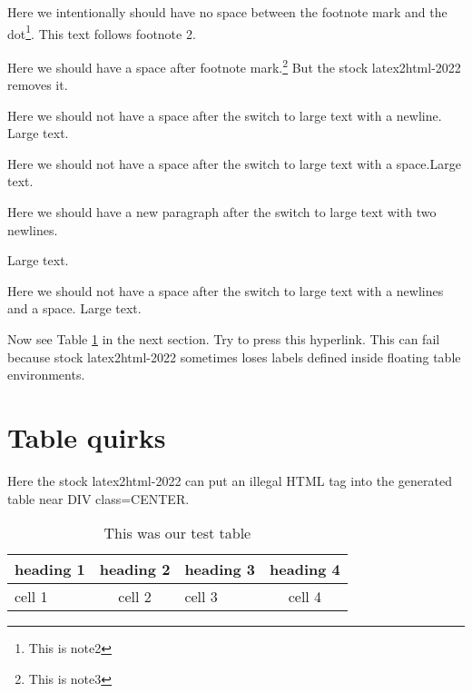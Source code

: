 \documentclass[12pt]{amsart}
\begin{document}
Here we intentionally should have no space between the footnote
mark and the dot\footnote{This is note2}. This text follows footnote 2.

Here we should have a space after footnote
mark.\footnote{This is note3}
But the stock latex2html-2022 removes it.

{Here we should not have a space after the
switch to large text with a newline.\large
Large text.}

{Here we should not have a space after the
switch to large text with a space.\large Large text.}

{Here we should have a new paragraph after the
switch to large text with two newlines.\large

Large text.}

{Here we should not have a space after the
switch to large text with a newlines and a space.\large
 Large text.}

Now see Table \ref{tablecap} in the next section. Try to press this hyperlink.
This can fail because stock latex2html-2022 sometimes loses labels
defined inside floating table environments.

\newpage

\section{Table quirks}

Here the stock latex2html-2022 can put an illegal HTML tag
into the generated table near DIV class=CENTER.

\begin{table}
\begin{centering}
\begin{tabular}{|>{\centering}m{6em}|c|>{\centering}m{4em}|c|}
  \hline 
  heading 1 & heading 2 & heading 3 & heading 4\\
  \hline 
  cell 1 & cell 2 & cell 3 & cell 4\\
  \hline 
\end{tabular}
\par\end{centering}
\caption{\label{tablecap}This was our test table}
\end{table}
\end{document}

